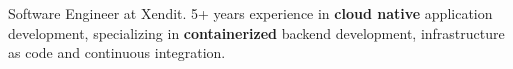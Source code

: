 

\begin{cvparagraph}

Software Engineer at Xendit. 5+ years experience in \textbf{cloud native} application development, specializing in \textbf{containerized} backend development, infrastructure as code and continuous integration.
\end{cvparagraph}
